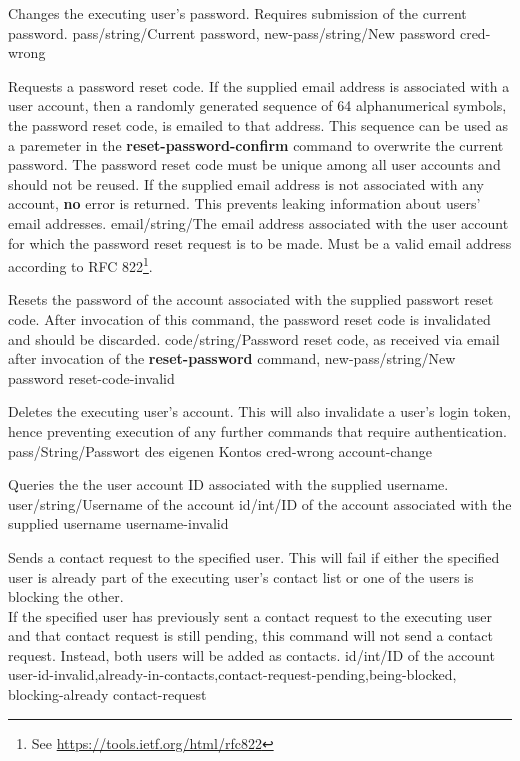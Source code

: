 \documentclass[parskip=full,11pt]{scrartcl}
\begin{document}
{Changes the executing user's password.
Requires submission of the current password.}
{pass/string/Current password,
new-pass/string/New password}
{}
{cred-wrong}
{}

{Requests a password reset code.
If the supplied email address is associated with a user account, then a
randomly generated sequence of 64 alphanumerical symbols, the password reset
code, is emailed to that address.
This sequence can be used as a paremeter in the \textbf{reset-password-confirm}
command to overwrite the current password.
The password reset code must be unique among all user accounts and should not
be reused.
If the supplied email address is not associated with any account, \textbf{no}
error is returned.
This prevents leaking information about users' email addresses.}
{email/string/The email address associated with the user account for which the
password reset request is to be made.
Must be a valid email address according to
RFC 822\footnote{See \url{https://tools.ietf.org/html/rfc822}}.}
{}
{}
{}

{Resets the password of the account associated with the supplied passwort reset
code.
After invocation of this command, the password reset code is invalidated and
should be discarded.}
{code/string/Password reset code{,} as received via email after invocation of
    the \textbf{reset-password} command,
new-pass/string/New password}
{}
{reset-code-invalid}
{}

{Deletes the executing user's account.
This will also invalidate a user's login token, hence preventing execution of
any further commands that require authentication.}
{pass/String/Passwort des eigenen Kontos}
{}
{cred-wrong}
{account-change}

{Queries the the user account ID associated with the supplied username.}
{user/string/Username of the account}
{id/int/ID of the account associated with the supplied username}
{username-invalid}
{}

{Sends a contact request to the specified user.
This will fail if either the specified user is already part of the executing
user's contact list or one of the users is blocking the other.
\\If the specified user has previously sent a contact request to the executing
user and that contact request is still pending{,} this command will not send a
contact request.
Instead{,} both users will be added as contacts.}
{id/int/ID of the account}
{}
{user-id-invalid,already-in-contacts,contact-request-pending,being-blocked,
blocking-already}
{contact-request}
\end{document}
